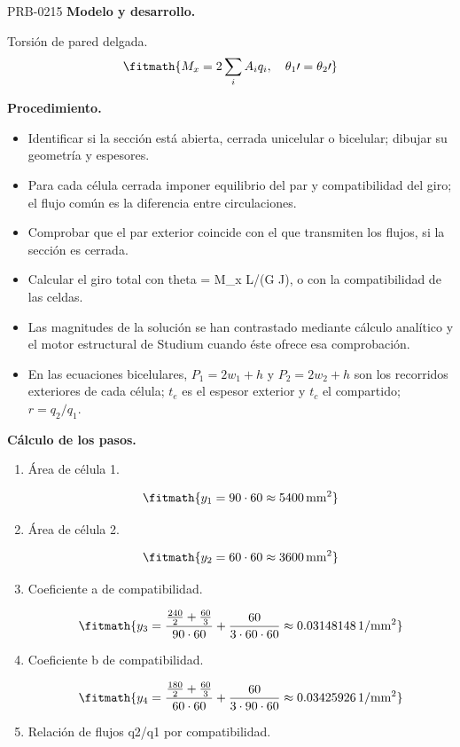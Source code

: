 \begin{studiumworked}{PRB-0215}
\textbf{Modelo y desarrollo.}

Torsión de pared delgada.\[\fitmath{M_x=2\sum_i A_iq_i,\quad \theta_1\prime=\theta_2\prime}\]

\textbf{Procedimiento.}\begin{itemize}\item Identificar si la sección está abierta, cerrada unicelular o bicelular; dibujar su geometría y espesores.
\item Para cada célula cerrada imponer equilibrio del par y compatibilidad del giro; el flujo común es la diferencia entre circulaciones.
\item Comprobar que el par exterior coincide con el que transmiten los flujos, si la sección es cerrada.
\item Calcular el giro total con theta = M\_x L/(G J), o con la compatibilidad de las celdas.
\item Las magnitudes de la solución se han contrastado mediante cálculo analítico y el motor estructural de Studium cuando éste ofrece esa comprobación.
\item En las ecuaciones bicelulares, $P_1=2w_1+h$ y $P_2=2w_2+h$ son los recorridos exteriores de cada célula; $t_e$ es el espesor exterior y $t_c$ el compartido; $r=q_2/q_1$.\end{itemize}

\textbf{Cálculo de los pasos.}

\begin{enumerate}

\item Área de célula 1.

\[\fitmath{y_{1}=90\cdot 60\approx 5400\,\mathrm{mm^{2}}}\]

\item Área de célula 2.

\[\fitmath{y_{2}=60\cdot 60\approx 3600\,\mathrm{mm^{2}}}\]

\item Coeficiente a de compatibilidad.

\[\fitmath{y_{3}=\frac{\frac{240}{2}+\frac{60}{3}}{90\cdot 60}+\frac{60}{3\cdot 60\cdot 60}\approx 0.03148148\,\mathrm{1/mm^{2}}}\]

\item Coeficiente b de compatibilidad.

\[\fitmath{y_{4}=\frac{\frac{180}{2}+\frac{60}{3}}{60\cdot 60}+\frac{60}{3\cdot 90\cdot 60}\approx 0.03425926\,\mathrm{1/mm^{2}}}\]

\item Relación de flujos q2/q1 por compatibilidad.


\end{enumerate}
\end{studiumworked}
